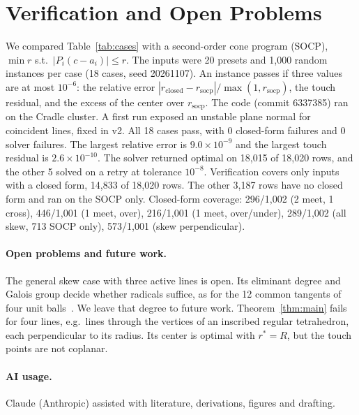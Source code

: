 \documentclass[10pt]{hackr26}
\begin{document}
\section{Verification and Open Problems} \label{sec:ver}
We compared Table~\ref{tab:cases} with a second-order cone program (SOCP), $\min r$ s.t.\ $|P_i(c-a_i)|\le r$.
The inputs were 20 presets and 1,000 random instances per case (18 cases, seed 20261107).
An instance passes if three values are at most $10^{-6}$: the relative error $|r_{\mathrm{closed}}-r_{\mathrm{socp}}|/\max(1,r_{\mathrm{socp}})$, the touch residual, and the excess of the center over $r_{\mathrm{socp}}$.
The code (commit 6337385) ran on the Cradle cluster.
A first run exposed an unstable plane normal for coincident lines, fixed in v2.
All 18 cases pass, with 0 closed-form failures and 0 solver failures.
The largest relative error is $9.0\times10^{-9}$ and the largest touch residual is $2.6\times10^{-10}$.
The solver returned optimal on 18,015 of 18,020 rows, and the other 5 solved on a retry at tolerance $10^{-8}$.
Verification covers only inputs with a closed form, 14,833 of 18,020 rows.
The other 3,187 rows have no closed form and ran on the SOCP only.
Closed-form coverage: 296/1,002 (2 meet, 1 cross), 446/1,001 (1 meet, over), 216/1,001 (1 meet, over/under), 289/1,002 (all skew, 713 SOCP only), 573/1,001 (skew perpendicular).
\paragraph{Open problems and future work.}
The general skew case with three active lines is open.
Its eliminant degree and Galois group decide whether radicals suffice, as for the 12 common tangents of four unit balls~\cite{MPT01}.
We leave that degree to future work.
Theorem~\ref{thm:main} fails for four lines, e.g.\ lines through the vertices of an inscribed regular tetrahedron, each perpendicular to its radius.
Its center is optimal with $r^*=R$, but the touch points are not coplanar.

\paragraph{AI usage.}
Claude (Anthropic) assisted with literature, derivations, figures and drafting.
\end{document}
